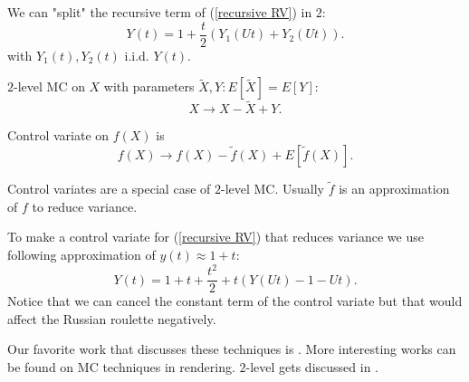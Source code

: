 \documentclass[a4paper,12pt]{article}
\begin{document}
\begin{example}
    We can "split" the recursive term of  (\ref{recursive RV}) in $2$:
    \[
        Y(t) = 1 + \frac{t}{2}(Y_{1}(Ut)+Y_{2}(Ut))
        .\]
    with $Y_{1}(t),Y_{2}(t)$ i.i.d. $Y(t)$.
\end{example}

\vspace{0.2cm}

\begin{pythonn}
\end{pythonn}

\begin{definition}[$2$-level MC] \label{2 level}
    $2$-level MC on $X$ with parameters $\tilde{X}, Y: E[\tilde{X}]=E[Y]$:
    \[
        X \rightarrow X-\tilde{X} + Y
        .\]
\end{definition}

\begin{definition} \label{CV}
    Control variate on $f(X)$ is
    \[
        f(X) \rightarrow f(X)-\tilde{f}(X) + E[\tilde{f}(X)]
        .\]
\end{definition}
Control variates are a special case of $2$-level MC. Usually $\tilde{f}$ is an approximation
of $f$ to reduce variance.

\begin{example}
    To make a control variate for (\ref{recursive RV}) that reduces variance
    we use following approximation of $y(t) \approx 1+t$:
    \[
        Y(t)= 1+t+\frac{t^{2}}{2} + t(Y(Ut)-1-Ut)
        .\]
    Notice that we can cancel the constant term of the control variate
    but that would affect the Russian roulette negatively.
\end{example}

\vspace*{0.2cm}
\begin{pythonn}
\end{pythonn}

\begin{related}
    Our favorite work that discusses these techniques is \cite{veach_robust_nodate}.
    More interesting works can be found on MC techniques in rendering.
    $2$-level gets discussed in \cite{giles_multilevel_2013}.
\end{related}
\end{document}

